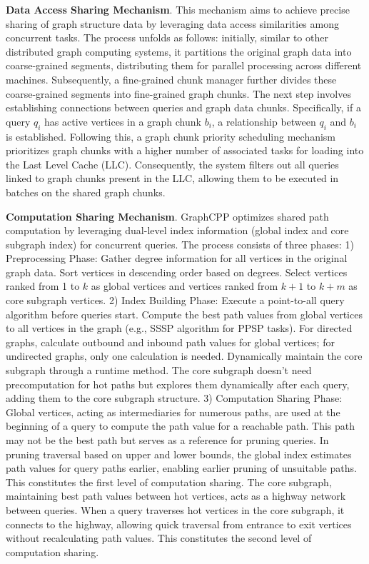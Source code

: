 \documentclass[lettersize,journal]{IEEEtran} %
\begin{document}
{\bf{Data Access Sharing Mechanism}}. This mechanism aims to achieve precise sharing of graph structure data by leveraging data access similarities among concurrent tasks. The process unfolds as follows: initially, similar to other distributed graph computing systems\cite{cgraph}\cite{multilyra}, it partitions the original graph data into coarse-grained segments, distributing them for parallel processing across different machines. Subsequently, a fine-grained chunk manager further divides these coarse-grained segments into fine-grained graph chunks. The next step involves establishing connections between queries and graph data chunks. Specifically, if a query $q_i$ has active vertices in a graph chunk $b_i$, a relationship between $q_i$ and $b_i$ is established. Following this, a graph chunk priority scheduling mechanism prioritizes graph chunks with a higher number of associated tasks for loading into the Last Level Cache (LLC). Consequently, the system filters out all queries linked to graph chunks present in the LLC, allowing them to be executed in batches on the shared graph chunks.

{\bf{Computation Sharing Mechanism}}. GraphCPP optimizes shared path computation by leveraging dual-level index information (global index and core subgraph index) for concurrent queries. The process consists of three phases: 1) Preprocessing Phase: Gather degree information for all vertices in the original graph data. Sort vertices in descending order based on degrees. Select vertices ranked from 1 to $k$ as global vertices and vertices ranked from $k+1$ to $k+m$ as core subgraph vertices. 2) Index Building Phase: Execute a point-to-all query algorithm before queries start. Compute the best path values from global vertices to all vertices in the graph (e.g., SSSP algorithm for PPSP tasks). For directed graphs, calculate outbound and inbound path values for global vertices; for undirected graphs, only one calculation is needed. Dynamically maintain the core subgraph through a runtime method. The core subgraph doesn't need precomputation for hot paths but explores them dynamically after each query, adding them to the core subgraph structure. 3) Computation Sharing Phase: Global vertices, acting as intermediaries for numerous paths, are used at the beginning of a query to compute the path value for a reachable path. This path may not be the best path but serves as a reference for pruning queries. In pruning traversal based on upper and lower bounds, the global index estimates path values for query paths earlier, enabling earlier pruning of unsuitable paths. This constitutes the first level of computation sharing. The core subgraph, maintaining best path values between hot vertices, acts as a highway network between queries. When a query traverses hot vertices in the core subgraph, it connects to the highway, allowing quick traversal from entrance to exit vertices without recalculating path values. This constitutes the second level of computation sharing.
\end{document}
